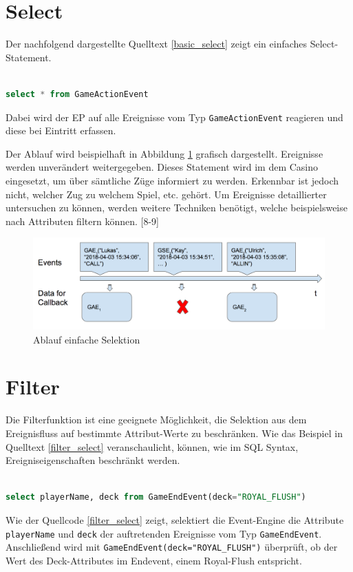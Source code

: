 \section{Select}

Der nachfolgend dargestellte Quelltext \ref{basic_select} zeigt ein einfaches Select-Statement.
\begin{lstlisting}[caption={Statement einfache Selektion},label=basic_select,captionpos=b,language=SQL]

select * from GameActionEvent

\end{lstlisting}
Dabei wird der \acf{EP} auf alle Ereignisse vom Typ \texttt{GameActionEvent} reagieren und diese bei Eintritt erfassen. 

Der Ablauf wird beispielhaft in Abbildung \ref{basic_select_img} grafisch dargestellt. Ereignisse werden unverändert weitergegeben. Dieses Statement wird im dem Casino eingesetzt, um über sämtliche Züge informiert zu werden. Erkennbar ist jedoch nicht, welcher Zug zu welchem Spiel, etc. gehört. Um Ereignisse detaillierter untersuchen zu können, werden weitere Techniken benötigt, welche beispielsweise nach Attributen filtern können.
\cite{EsperRef2018}[8-9]

\begin{figure}[h]
	\centering
	\includegraphics[width=\textwidth,height=\textheight, keepaspectratio]{images/statement_basic_select.png}
	\caption{Ablauf einfache Selektion}
	\label{basic_select_img}
\end{figure}

\section{Filter}

Die Filterfunktion ist eine geeignete Möglichkeit, die Selektion aus dem Ereignisfluss auf bestimmte Attribut-Werte zu beschränken. Wie das Beispiel in Quelltext \ref{filter_select} veranschaulicht, können, wie im SQL Syntax, Ereigniseigenschaften beschränkt werden.
\begin{lstlisting}[caption={Statement mit Filter},label=filter_select,captionpos=b,language=SQL]

select playerName, deck from GameEndEvent(deck="ROYAL_FLUSH")

\end{lstlisting}
Wie der Quellcode \ref{filter_select} zeigt, selektiert die Event-Engine die Attribute \texttt{playerName} und \texttt{deck} der auftretenden Ereignisse vom Typ \texttt{GameEndEvent}. Anschließend wird mit \texttt{GameEndEvent(deck="ROYAL\_FLUSH")} überprüft, ob der Wert des Deck-Attributes im Endevent, einem Royal-Flush entspricht.

